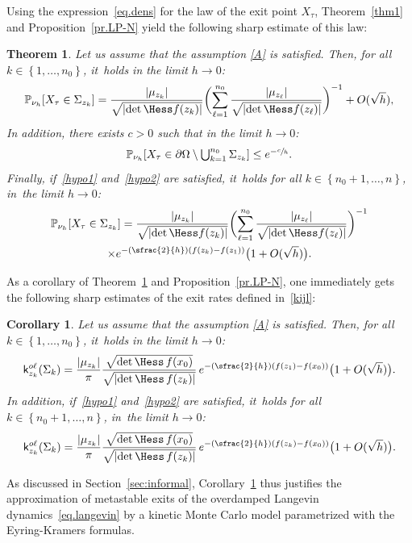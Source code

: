 \documentclass[JEP,XML,SOM,Unicode,NoEqCountersInSection,NoFloatCountersInSection,published]{cedram}
\newcommand{\Psfrac}[2]{(\sfrac{#1}{#2})}
\let\ts\textstyle
\theoremstyle{plain}
\newtheorem{theorem}{Theorem}
\newtheorem{corollary}[proposition]{Corollary}
\theoremstyle{definition}
\begin{document}
Using the expression~\eqref{eq.dens} for the law of the exit point $X_\tau$, Theorem~\ref{thm1} and Proposition~\ref{pr.LP-N} yield the following
sharp estimate of this law:
\begin{theorem}\label{thm2}
Let us assume that the assumption \ref{A} is satisfied. Then, for all $k\in \left\{1,\ldots,n_0\right\}$, it~holds in the limit $h\to 0$:
\begin{equation}\label{eq.puh1}
\mathbb P_{\nu_h}[X_{\tau}\in \Sigma_{z_k}]= \frac{ \vert \mu_{z_k}\vert }{\sqrt{\vert {\det \Hess f (z_k)} \vert } }
\biggl (\sum_{\ell=1}^{n_0} \frac{ \vert \mu_{z_\ell}\vert }{\sqrt{\vert {\det \Hess f (z_\ell)} \vert } } \biggr)^{-1} + O({\sqrt h}),
\end{equation}
In addition, there exists $c>0$ such that in the limit $h\to 0$:
\begin{equation}\label{eq.puh2}\ts
\mathbb P_{\nu_h}[X_{\tau}\in \partial \Omega \setminus \bigcup_{k=1}^{n_0}\Sigma_{z_k}]\le e^{-\sfrac{c}{h}}.
\end{equation}
Finally, if~\eqref{hypo1} and~\eqref{hypo2} are satisfied, it~holds for all $k\in \left\{n_0+1,\ldots,n\right\}$, in~the limit $h\to 0$:
\begin{multline}\label{eq.puh3}
\mathbb P_{\nu_h}[X_{\tau}\in \Sigma_{z_k}]=\frac{ \vert \mu_{z_k}\vert }{\sqrt{\vert {\det \Hess f (z_k)} \vert } }
\biggl (\sum_{\ell=1}^{n_0} \frac{ \vert \mu_{z_\ell}\vert }{\sqrt{
\vert {\det \Hess f (z_\ell)} \vert } } \biggr)^{-1} \\
\times e^{-\Psfrac{2}{h}(f(z_k)-f(z_1))}\bigl(1+ O({\sqrt h})
\bigr).
\end{multline}
\end{theorem}

As a corollary of Theorem~\ref{thm2} and Proposition~\ref{pr.LP-N},
one immediately gets the following sharp estimates of the exit rates defined in~\eqref{kijl}:
\begin{corollary}\label{co.ek}
Let us assume that the assumption \ref{A} is satisfied.
Then, for all $k\in \left\{1,\ldots,n_0\right\} $, it~holds in the limit $h\to 0$:
\begin{equation}\label{eq.k*1}
\mathsf k_{z_k}^{o\ell}(\Sigma_k)= \frac{\vert \mu_{z_k}\vert}{\pi }\frac{ \sqrt{{\det\Hess}\, f (x_0) } }{ \sqrt{\vert {\det \Hess}\, f(z_k) \vert } } \,e^{-\Psfrac{2}{h}(f(z_1)-f(x_0))}\bigl(1+ O({\sqrt h}) \bigr).
\end{equation}
In addition, if~\eqref{hypo1} and~\eqref{hypo2} are satisfied, it~holds for all $k\in \left\{n_0+1,\ldots,n\right\}$, in~the limit $h\to 0$:
\begin{equation}\label{eq.k*2}
\mathsf k_{z_k}^{o\ell}(\Sigma_k)= \frac{\vert \mu_{z_k}\vert}{\pi }\frac{ \sqrt{{\det\Hess}\, f (x_0) } }{ \sqrt{\vert {\det \Hess}\, f(z_k) \vert } } \,e^{-\Psfrac{2}{h}(f(z_k)-f(x_0))}\bigl(1+ O({\sqrt h}) \bigr).
\end{equation}
\end{corollary}
As discussed in Section~\ref{sec:informal}, Corollary~\ref{co.ek}
thus justifies the approximation of metastable exits of the overdamped Langevin
dynamics~\eqref{eq.langevin} by a kinetic Monte Carlo model
parametrized with the Eyring-Kramers formulas.
\end{document}
